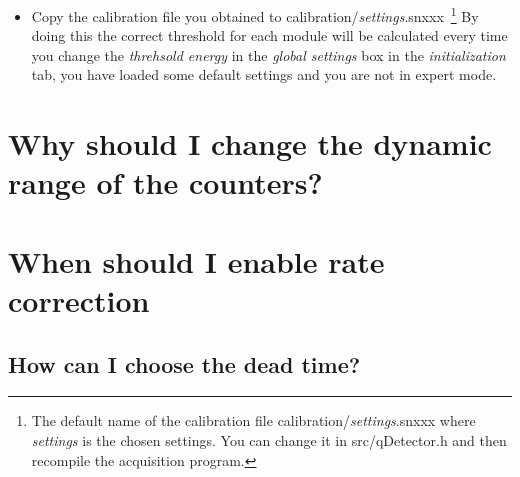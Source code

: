 \begin{itemize}
\item Copy the calibration file you obtained to \textsf{calibration}/\textit{settings}\textsf{.snxxx}~\footnote{The default name of the calibration file \textsf{calibration/}\textit{settings}\textsf{.snxxx} where  \textit{settings} is the chosen settings. You  can change it in \textsf{src/qDetector.h} and then recompile the acquisition program.} By doing this the correct threshold for each module will be calculated every time you change the \textit{threhsold energy} in the \textit{global settings} box in the \textit{initialization} tab, you have loaded some default settings and you are not in expert mode.  
\end{itemize}

\section{Why should I change the dynamic range of the counters?}

\section{When should I enable rate correction}
\subsection{How can I choose the dead time?}

